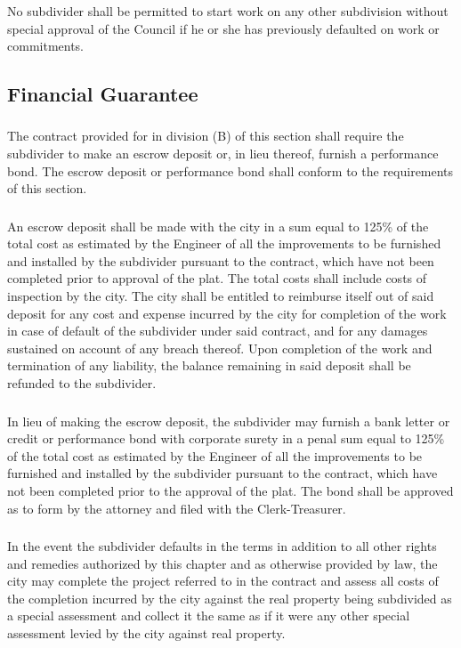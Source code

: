 \subsubsection{}
No subdivider shall be permitted to start work on any other subdivision without special approval of the Council if he or she has previously defaulted on work or commitments.
\subsection{Financial Guarantee}
\subsubsection{}
The contract provided for in division (B) of this section shall require the subdivider to make an escrow deposit or, in lieu thereof, furnish a performance bond. The escrow deposit or performance bond shall conform to the requirements of this section.
\subsubsection{}
An escrow deposit shall be made with the city in a sum equal to 125\% of the total cost as estimated by the Engineer of all the improvements to be furnished and installed by the subdivider pursuant to the contract, which have not been completed prior to approval of the plat. The total costs shall include costs of inspection by the city. The city shall be entitled to reimburse itself out of said deposit for any cost and expense incurred by the city for completion of the work in case of default of the subdivider under said contract, and for any damages sustained on account of any breach thereof.  Upon completion of the work and termination of any liability, the balance remaining in said deposit shall be refunded to the subdivider.
\subsubsection{}
In lieu of making the escrow deposit, the subdivider may furnish a bank letter or credit or performance bond with corporate surety in a penal sum equal to 125\% of the total cost as estimated by the Engineer of all the improvements to be furnished and installed by the subdivider pursuant to the contract, which have not been completed prior to the approval of the plat. The bond shall be approved as to form by the attorney and filed with the Clerk-Treasurer.
\subsubsection{}
In the event the subdivider defaults in the terms in addition to all other rights and remedies authorized by this chapter and as otherwise provided by law, the city may complete the project referred to in the contract and assess all costs of the completion incurred by the city against the real property being subdivided as a special assessment and collect it the same as if it were any other special assessment levied by the city against real property.
